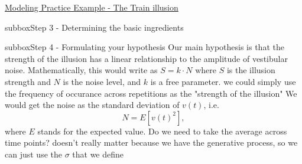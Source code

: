 \begin{textbox}{\href{https://compneuro.neuromatch.io/projects/modelingsteps/ModelingSteps_5through10.html}{Modeling Practice Example - The Train illusion} }
\begin{subbox}{subbox}{Step 3 - Determining the basic ingredients  }
\end{subbox}
\begin{subbox}{subbox}{Step 4 - Formulating your hypothesis}
\scriptsize
Our main hypothesis is that the strength of the illusion has a linear relationship to the amplitude of vestibular noise.
Mathematically, this would write as
$S = k \cdot N$ where $S$ is the illusion strength and $N$ is the noise level, and $k$ is a free parameter.
we could simply use the frequency of occurance across repetitions as the "strength of the illusion"
We would get the noise as the standard deviation of $v(t)$, i.e.
$$N = E[v(t)^2],$$
where $E$ stands for the expected value.
Do we need to take the average across time points?
doesn't really matter because we have the generative process, so we can just use the $\sigma$ that we define

\end{subbox}

\end{textbox}


